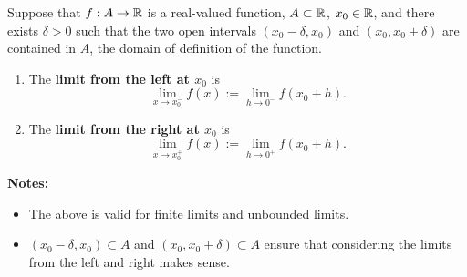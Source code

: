 \bigskip







\begin{tcolorbox}[colback=mylightblue, title = {\bf One-sided Limits at a Point}, breakable]
\begin{definition}
\label{def:OneSidedlimits}
Suppose that  $f:A \to  \mathbb R$ is a real-valued function, $A \subset \mathbb R$, $x_0 \in \mathbb R$, and there exists $\delta >0$ such that the two open intervals $(x_0-\delta, x_0)$ and $(x_0, x_0 + \delta)$ are contained in $A$, the domain of definition of the function.
\begin{enumerate}
\renewcommand{\labelenumi}{(\alph{enumi})}
\setlength{\itemsep}{.2cm}
    \item The \textbf{limit from the left at $x_0$} is 
    $$ \lim_{x \to x_0^-} f(x):=  \lim_{h \to 0^-} f(x_0+h). $$ 

      \item The \textbf{limit from the right at $x_0$} is 
    $$ \lim_{x \to x_0^+} f(x) := \lim_{h \to 0^+} f(x_0+h). $$ 
\end{enumerate}

\end{definition}

\textbf{Notes:} 
\begin{itemize}
\item The above is valid for finite limits and unbounded limits.

\item  $(x_0-\delta, x_0) \subset A$ and $(x_0, x_0 + \delta) \subset A$ ensure that considering the limits from the left and right makes sense.

\end{itemize}

\end{tcolorbox}

